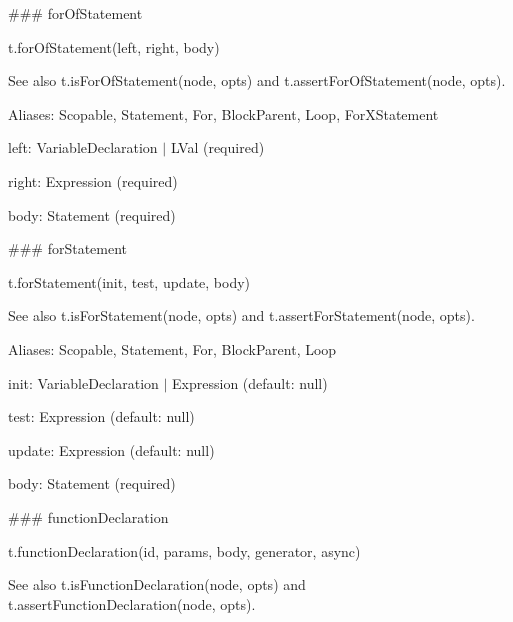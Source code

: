 \#\#\# for\+Of\+Statement 
\begin{DoxyCode}
t.forOfStatement(left, right, body)
\end{DoxyCode}


See also {\ttfamily t.\+is\+For\+Of\+Statement(node, opts)} and {\ttfamily t.\+assert\+For\+Of\+Statement(node, opts)}.

Aliases\+: {\ttfamily Scopable}, {\ttfamily Statement}, {\ttfamily For}, {\ttfamily Block\+Parent}, {\ttfamily Loop}, {\ttfamily For\+X\+Statement}


\begin{DoxyItemize}
\item {\ttfamily left}\+: {\ttfamily Variable\+Declaration $\vert$ L\+Val} (required)
\item {\ttfamily right}\+: {\ttfamily Expression} (required)
\item {\ttfamily body}\+: {\ttfamily Statement} (required) 


\end{DoxyItemize}

\#\#\# for\+Statement 
\begin{DoxyCode}
t.forStatement(init, test, update, body)
\end{DoxyCode}


See also {\ttfamily t.\+is\+For\+Statement(node, opts)} and {\ttfamily t.\+assert\+For\+Statement(node, opts)}.

Aliases\+: {\ttfamily Scopable}, {\ttfamily Statement}, {\ttfamily For}, {\ttfamily Block\+Parent}, {\ttfamily Loop}


\begin{DoxyItemize}
\item {\ttfamily init}\+: {\ttfamily Variable\+Declaration $\vert$ Expression} (default\+: {\ttfamily null})
\item {\ttfamily test}\+: {\ttfamily Expression} (default\+: {\ttfamily null})
\item {\ttfamily update}\+: {\ttfamily Expression} (default\+: {\ttfamily null})
\item {\ttfamily body}\+: {\ttfamily Statement} (required) 


\end{DoxyItemize}

\#\#\# function\+Declaration 
\begin{DoxyCode}
t.functionDeclaration(id, params, body, generator, async)
\end{DoxyCode}


See also {\ttfamily t.\+is\+Function\+Declaration(node, opts)} and {\ttfamily t.\+assert\+Function\+Declaration(node, opts)}.

